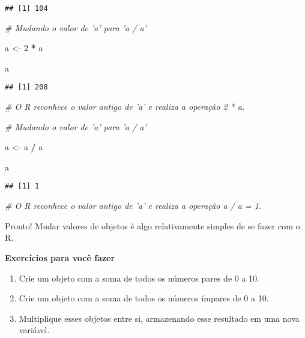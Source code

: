 \documentclass[
]{article}
\newenvironment{Shaded}{\begin{snugshade}}{\end{snugshade}}
\newcommand{\CommentTok}[1]{\textcolor[rgb]{0.56,0.35,0.01}{\textit{#1}}}
\newcommand{\DecValTok}[1]{\textcolor[rgb]{0.00,0.00,0.81}{#1}}
\newcommand{\NormalTok}[1]{#1}
\newcommand{\OperatorTok}[1]{\textcolor[rgb]{0.81,0.36,0.00}{\textbf{#1}}}
\newcommand{\StringTok}[1]{\textcolor[rgb]{0.31,0.60,0.02}{#1}}
\begin{document}
\begin{verbatim}
## [1] 104
\end{verbatim}

\begin{Shaded}
\begin{Highlighting}[]
\CommentTok{# Mudando o valor de 'a' para 'a / a'}

\NormalTok{a <-}\StringTok{ }\DecValTok{2} \OperatorTok{*}\StringTok{ }\NormalTok{a}

\NormalTok{a}
\end{Highlighting}
\end{Shaded}

\begin{verbatim}
## [1] 208
\end{verbatim}

\begin{Shaded}
\begin{Highlighting}[]
\CommentTok{# O R reconhece o valor antigo de 'a' e realiza a operação 2 * a.}

\CommentTok{# Mudando o valor de 'a' para 'a / a'}

\NormalTok{a <-}\StringTok{ }\NormalTok{a }\OperatorTok{/}\StringTok{ }\NormalTok{a}

\NormalTok{a}
\end{Highlighting}
\end{Shaded}

\begin{verbatim}
## [1] 1
\end{verbatim}

\begin{Shaded}
\begin{Highlighting}[]
\CommentTok{# O R reconhece o valor antigo de 'a' e realiza a operação a / a = 1.}
\end{Highlighting}
\end{Shaded}

Pronto! Mudar valores de objetos é algo relativamente simples de se
fazer com o R.

\textbf{Exercícios para você fazer}

\begin{enumerate}
\def\labelenumi{\arabic{enumi}.}
\item
  Crie um objeto com a soma de todos os números pares de 0 a 10.
\item
  Crie um objeto com a soma de todos os números ímpares de 0 a 10.
\item
  Multiplique esses objetos entre si, armazenando esse resultado em uma
  nova variável.
\end{enumerate}
\end{document}
